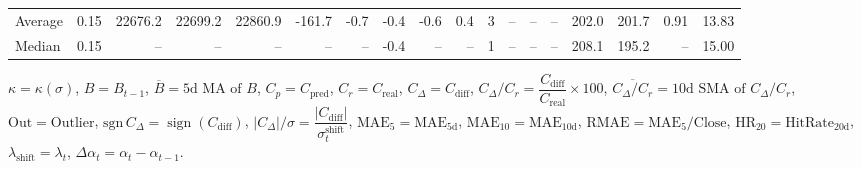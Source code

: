 \begin{threeparttable}
{\begin{tabular}{lrrrrrrrrrrrrrrrrr}
Average &     0.15 & 22676.2 & 22699.2 & 22860.9 &     -161.7 &           -0.7 &                      -0.4 &                     -0.6 &                 0.4 &              3 &         -- &        -- &             -- &            202.0 &               201.7 &            0.91 &                  13.83 \\
 Median &     0.15 &      -- &      -- &      -- &         -- &             -- &                      -0.4 &                       -- &                  -- &              1 &         -- &        -- &             -- &            208.1 &               195.2 &              -- &                  15.00 \\
\bottomrule
\end{tabular}
}
\begin{tablenotes}\footnotesize
\item $\kappa=\kappa(\sigma)$, $B=B_{t-1}$, $\overline{B}=\text{5d MA of }B$, $C_p=C_{\text{pred}}$, $C_r=C_{\text{real}}$, $C_\Delta=C_{\text{diff}}$, $C_\Delta/C_r=\dfrac{C_{\text{diff}}}{C_{\text{real}}}\times100$, $\overline{C_\Delta/C_r}=\text{10d SMA of }C_\Delta/C_r$, $\mathrm{Out}=\text{Outlier}$, $\mathrm{sgn}\,C_\Delta=\operatorname{sign}(C_{\text{diff}})$, $|C_\Delta|/\sigma=\dfrac{|C_{\text{diff}}|}{\sigma_t^{\text{shift}}}$, $\mathrm{MAE}_5=\mathrm{MAE}_{5\text{d}}$, $\mathrm{MAE}_{10}=\mathrm{MAE}_{10\text{d}}$, $\mathrm{RMAE}= \mathrm{MAE}_5 / \text{Close}$, $\mathrm{HR}_{20}=\mathrm{HitRate}_{20\text{d}}$, $\lambda_{\text{shift}}=\lambda_t$, $\Delta\alpha_t=\alpha_t-\alpha_{t-1}$.
\end{tablenotes}
\end{threeparttable}
\endgroup

